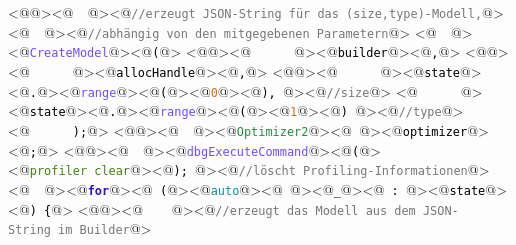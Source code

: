 <@\textcolor[HTML]{000000}{\texttt{}}@><@\textcolor[HTML]{000000}{\texttt{\ \ }}@><@\textcolor[HTML]{777777}{\texttt{//erzeugt\ JSON-String\ für\ das\ (size,type)-Modell,}}@>
<@\textcolor[HTML]{000000}{\texttt{\ \ }}@><@\textcolor[HTML]{777777}{\texttt{//abhängig\ von\ den\ mitgegebenen\ Parametern}}@>
<@\textcolor[HTML]{000000}{\texttt{\ \ }}@><@\textcolor[HTML]{724BFF}{\texttt{CreateModel}}@><@\textcolor[HTML]{000000}{\texttt{(}}@>
<@\textcolor[HTML]{000000}{\texttt{}}@><@\textcolor[HTML]{000000}{\texttt{\ \ \ \ \ \ }}@><@\textcolor[HTML]{000000}{\texttt{builder}}@><@\textcolor[HTML]{000000}{\texttt{,}}@>
<@\textcolor[HTML]{000000}{\texttt{}}@><@\textcolor[HTML]{000000}{\texttt{\ \ \ \ \ \ }}@><@\textcolor[HTML]{000000}{\texttt{allocHandle}}@><@\textcolor[HTML]{000000}{\texttt{,}}@>
<@\textcolor[HTML]{000000}{\texttt{}}@><@\textcolor[HTML]{000000}{\texttt{\ \ \ \ \ \ }}@><@\textcolor[HTML]{000000}{\texttt{state}}@><@\textcolor[HTML]{000000}{\texttt{.}}@><@\textcolor[HTML]{724BFF}{\texttt{range}}@><@\textcolor[HTML]{000000}{\texttt{(}}@><@\textcolor[HTML]{DE6F10}{\texttt{0}}@><@\textcolor[HTML]{000000}{\texttt{),\ }}@><@\textcolor[HTML]{777777}{\texttt{//size}}@>
<@\textcolor[HTML]{000000}{\texttt{\ \ \ \ \ \ }}@><@\textcolor[HTML]{000000}{\texttt{state}}@><@\textcolor[HTML]{000000}{\texttt{.}}@><@\textcolor[HTML]{724BFF}{\texttt{range}}@><@\textcolor[HTML]{000000}{\texttt{(}}@><@\textcolor[HTML]{DE6F10}{\texttt{1}}@><@\textcolor[HTML]{000000}{\texttt{)\ }}@><@\textcolor[HTML]{777777}{\texttt{//type}}@>
<@\textcolor[HTML]{000000}{\texttt{\ \ \ \ \ \ );}}@>
<@\textcolor[HTML]{000000}{\texttt{}}@><@\textcolor[HTML]{000000}{\texttt{\ \ }}@><@\textcolor[HTML]{1F8F42}{\texttt{Optimizer2}}@><@\textcolor[HTML]{000000}{\texttt{\ }}@><@\textcolor[HTML]{000000}{\texttt{optimizer}}@><@\textcolor[HTML]{000000}{\texttt{;}}@>
<@\textcolor[HTML]{000000}{\texttt{}}@><@\textcolor[HTML]{000000}{\texttt{\ \ }}@><@\textcolor[HTML]{724BFF}{\texttt{dbgExecuteCommand}}@><@\textcolor[HTML]{000000}{\texttt{(}}@><@\textcolor[HTML]{418310}{\texttt{\dq{}profiler\ clear\dq{}}}@><@\textcolor[HTML]{000000}{\texttt{);\ }}@><@\textcolor[HTML]{777777}{\texttt{//löscht\ Profiling-Informationen}}@>
<@\textcolor[HTML]{000000}{\texttt{\ \ }}@><@\textcolor[HTML]{3010CF}{\textbf{\texttt{for}}}@><@\textcolor[HTML]{000000}{\texttt{\ (}}@><@\textcolor[HTML]{10909F}{\texttt{auto}}@><@\textcolor[HTML]{000000}{\texttt{\ }}@><@\textcolor[HTML]{000000}{\texttt{\_}}@><@\textcolor[HTML]{000000}{\texttt{\ :\ }}@><@\textcolor[HTML]{000000}{\texttt{state}}@><@\textcolor[HTML]{000000}{\texttt{)\ \{}}@>
<@\textcolor[HTML]{000000}{\texttt{}}@><@\textcolor[HTML]{000000}{\texttt{\ \ \ \ }}@><@\textcolor[HTML]{777777}{\texttt{//erzeugt\ das\ Modell\ aus\ dem\ JSON-String\ im\ Builder}}@>
